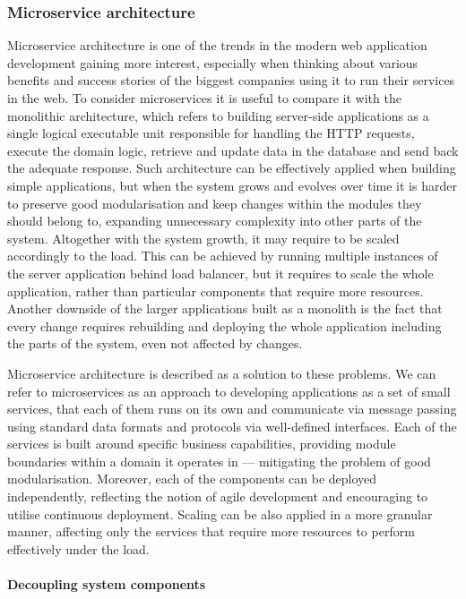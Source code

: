 \subsubsection{Microservice architecture} \label{section:web-apps-microservices}

Microservice architecture is one of the trends in the modern web application development gaining more interest, especially when thinking about various benefits and success stories of the biggest companies using it to run their services in the web. To consider microservices it is useful to compare it with the monolithic architecture, which refers to building server-side applications as a single logical executable unit responsible for handling the HTTP requests, execute the domain logic, retrieve and update data in the database and send back the adequate response. Such architecture can be effectively applied when building simple applications, but when the system grows and evolves over time it is harder to preserve good modularisation and keep changes within the modules they should belong to, expanding unnecessary complexity into other parts of the system. Altogether with the system growth, it may require to be scaled accordingly to the load. This can be achieved by running multiple instances of the server application behind load balancer, but it requires to scale the whole application, rather than particular components that require more resources. Another downside of the larger applications built as a monolith is the fact that every change requires rebuilding and deploying the whole application including the parts of the system, even not affected by changes.

Microservice architecture \cite{FowlerMicroservices} is described as a solution to these problems. We can refer to microservices as an approach to developing applications as a set of small services, that each of them runs on its own and communicate via message passing using standard data formats and protocols via well-defined interfaces. Each of the services is built around specific business capabilities, providing module boundaries within a domain it operates in --- mitigating the problem of good modularisation. Moreover, each of the components can be deployed independently, reflecting the notion of agile development and encouraging to utilise continuous deployment. Scaling can be also applied in a more granular manner, affecting only the services that require more resources to perform effectively under the load.

\paragraph{Decoupling system components}

